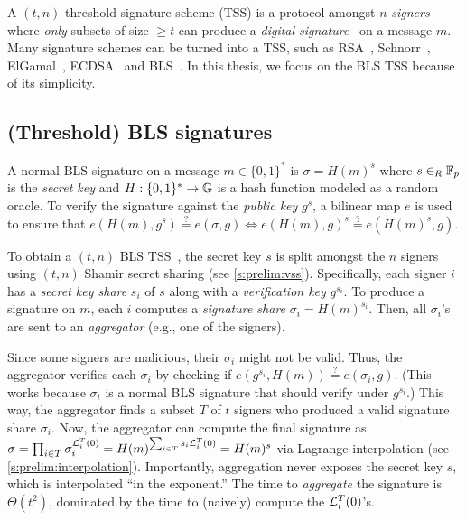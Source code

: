 A $(t,n)$-threshold signature scheme (TSS) is a protocol amongst $n$ \textit{signers} where \textit{only} subsets of size $\ge t$ can produce a \textit{digital signature}~\cite{rsa} on a message $m$.
Many signature schemes can be turned into a TSS, such as 
RSA~\cite{rsa,Shoup00}, 
Schnorr~\cite{Schnorr89,SS01,GJKR03}, 
ElGamal~\cite{ElGamal1985APublicKey,PK96,GJKR96}, 
ECDSA~\cite{GGN16} and 
BLS~\cite{BLS04,Boldyreva03}.
In this thesis, we focus on the BLS TSS because of its simplicity.

\subsection{(Threshold) BLS signatures}
\label{s:prelim:threshsig:bls}

A normal BLS signature on a message $m\in \{0,1\}^*$ is $\sigma = H(m)^s$ where $s\in_R \mathbb{F}_p$ is the \textit{secret key} and $H : \{0,1\}^* \rightarrow \mathbb{G}$ is a hash function modeled as a random oracle.
To verify the signature against the \textit{public key} $g^s$, a bilinear map $e$ is used to ensure that $e(H(m), g^s) \stackrel{?}{=} e(\sigma, g)\Leftrightarrow e(H(m),g)^s \stackrel{?}{=} e(H(m)^s, g)$.

To obtain a $(t,n)$ BLS TSS~\cite{Boldyreva03}, the secret key $s$ is split amongst the $n$ signers using $(t,n)$ Shamir secret sharing (see \cref{s:prelim:vss}).
Specifically, each signer $i$ has a \textit{secret key share} $s_i$ of $s$ along with a \textit{verification key} $g^{s_i}$.
To produce a signature on $m$, each $i$ computes a \textit{signature share} $\sigma_i = H(m)^{s_i}$.
Then, all $\sigma_i$'s are sent to an \textit{aggregator} (e.g., one of the signers).

Since some signers are malicious, their $\sigma_i$ might not be valid.
Thus, the aggregator verifies each $\sigma_i$ by checking if $e(g^{s_i}, H(m)) \stackrel{?}{=} e(\sigma_i, g)$.
(This works because $\sigma_i$ is a normal BLS signature that should verify under $g^{s_i}$.)
This way, the aggregator finds a subset $T$ of $t$ signers who produced a valid signature share $\sigma_i$.
Now, the aggregator can compute the final signature as $\sigma = \prod_{i\in T} {\sigma_i^{\mathcal{L}_i^T(0)}} = H(m)^{\sum_{i\in T} {s_i \mathcal{L}_i^T(0)}} = H(m)^s$ via Lagrange interpolation (see \cref{s:prelim:interpolation}).
Importantly, aggregation never exposes the secret key $s$, which is interpolated ``in the exponent.''
The time to \textit{aggregate} the signature is $\Theta(t^2)$, dominated by the time to (naively) compute the $\mathcal{L}_i^T(0)$'s.
